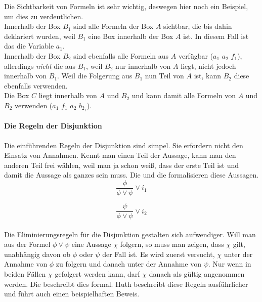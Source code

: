 Die Sichtbarkeit von Formeln ist sehr wichtig, deswegen hier noch ein Beispiel, um dies zu verdeutlichen.\\
Innerhalb der Box $B_1$ sind alle Formeln der Box $A$ sichtbar, die bis dahin deklariert wurden, weil $B_1$ eine Box innerhalb der Box $A$ ist. In diesem Fall ist das die Variable $a_1$.\\
Innerhalb der Box $B_2$ sind ebenfalls alle Formeln aus $A$ verfügbar ($a_1$ $a_2$ $f_1$), allerdings \emph{nicht} die aus $B_1$, weil $B_2$ nur innerhalb von $A$ liegt, nicht jedoch innerhalb von $B_1$.
Weil die Folgerung aus $B_1$ nun Teil von $A$ ist, kann $B_2$ diese ebenfalls verwenden.\\
Die Box $C$ liegt innerhalb von $A$ und $B_2$ und kann damit alle Formeln von $A$ und $B_2$ verwenden ($a_1$ $f_1$ $a_2$ $b_{2_1}$).\\


\paragraph{Die Regeln der Disjunktion}

Die einführenden Regeln der Disjunktion sind simpel.
Sie erfordern nicht den Einsatz von Annahmen.
Kennt man einen Teil der Aussage, kann man den anderen Teil frei wählen, weil man ja schon weiß, dass der erste Teil \true ist und damit die Aussage als ganzes \true sein muss.
Die  und die  formalisieren diese Aussagen.\\

\begin{equation}
	\label{eq:i1Disjunction}
	\frac{\phi}{\phi \vee \psi} \vee i_1
\end{equation}

\begin{equation}
	\label{eq:i2Disjunction}
	\frac{\psi}{\phi \vee \psi} \vee i_2
\end{equation}
\\
Die Eliminierungsregeln für die Disjunktion gestalten sich aufwendiger.
Will man aus der Formel $\phi \vee \psi$ eine Aussage $\chi$ folgern, so muss man zeigen, dass $\chi$ gilt, unabhängig davon ob $\phi$ oder $\psi$ der Fall ist.
Es wird zuerst versucht, $\chi$ unter der Annahme von  $\phi$ zu folgern und danach unter der Annahme von $\psi$.
Nur wenn in beiden Fällen $\chi$ gefolgert werden kann, darf $\chi$ danach als gültig angenommen werden.
Die  beschreibt dies formal. 
Huth \cite[S.16ff]{huth2004logic} beschreibt diese Regeln ausführlicher und führt auch einen beispielhaften Beweis.

